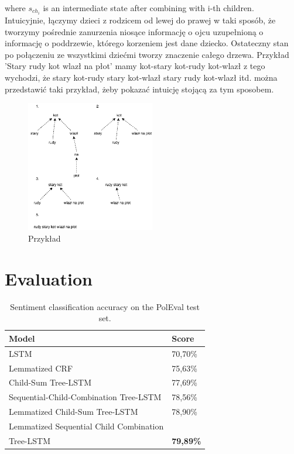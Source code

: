 \documentclass[10pt, a4paper]{article}
\begin{document}
	where $s_{ch_i}$ is an intermediate state after combining with i-th children.\\
Intuicyjnie, łączymy dzieci z rodzicem od lewej do prawej w taki sposób, że tworzymy pośrednie zanurzenia niosące informację o ojcu uzupełnioną o informację o poddrzewie, którego korzeniem jest dane dziecko.
Ostateczny stan po połączeniu ze wszystkimi dziećmi tworzy znaczenie całego drzewa.
Przykład 'Stary rudy kot wlazł na płot'
mamy kot-stary kot-rudy kot-wlazł
z tego wychodzi, że stary kot-rudy stary kot-wlazł
stary rudy kot-wlazł itd.
można przedstawić taki przykład, żeby pokazać intuicję stojącą za tym sposobem.
\begin{figure}[h]
	\begin{center}
		\includegraphics[width=0.5\textwidth]{staryrudykot}
		\caption{Przykład}
	\end{center}
\end{figure}
	
\section{Evaluation} 

\begin{table}[h]
 \begin{center}
\begin{tabular}{|l|l|}

      \hline
      Model & Score\\
      \hline
      LSTM &70,70\%\\
      \hline
      Lemmatized CRF & 75,63\%\\
      \hline
      Child-Sum Tree-LSTM &  77,69\%\\
      \hline
      Sequential-Child-Combination Tree-LSTM & 78,56\%\\
      \hline
      Lemmatized Child-Sum Tree-LSTM & 78,90\%\\
      \hline
      Lemmatized Sequential Child Combination & \\
      Tree-LSTM & \textbf{79,89\%} \\
      \hline
\end{tabular}
\caption{Sentiment classification accuracy on the PolEval test set.}
\label{tab:evaluation}
 \end{center}
\end{table}
\end{document}
